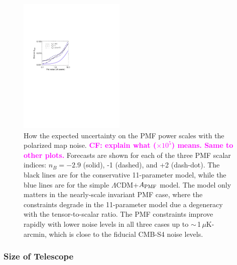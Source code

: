 \documentclass[apj]{emulateapj}
\newcommand{\apmf}{\ensuremath{A_{\rm PMF}}}
\newcommand{\lcdm}{\ensuremath{\Lambda}CDM}
\newcommand{\ukarcmin}{\ensuremath{\mu}K-arcmin}
\begin{document}
\begin{figure}[htb]\centering
\includegraphics[width=0.45\textwidth,clip,trim={1.5cm 12.5cm 11cm 7.5cm}]{pmf_sens.pdf}
  \caption[]{ \label{fig:sensitivity}
  How the expected uncertainty on the PMF power scales with the polarized map noise. \textbf{\textcolor{magenta}{CF: explain what ($\times10^5$) means. Same to other plots.}}
  Forecasts are shown for each of the three PMF scalar indices: $n_B = -2.9$ (solid), -1 (dashed), and +2 (dash-dot). 
  The black lines are for the conservative 11-parameter model, while the blue lines are for the simple \lcdm{}+\apmf{} model. 
  The model only matters in the nearly-scale invariant PMF case, where the constraints degrade in the 11-parameter model due a degeneracy with the tensor-to-scalar ratio. 
  The PMF constraints improve rapidly with lower noise levels in all three cases up to $\sim$\,1\,\ukarcmin, which is close to the  fiducial CMB-S4 noise levels. 
    }
\end{figure}

\subsubsection{Size of Telescope }
\end{document}
